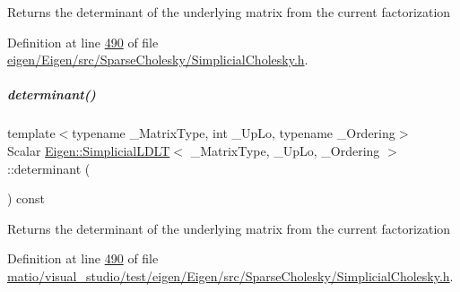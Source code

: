 \begin{DoxyReturn}{Returns}
the determinant of the underlying matrix from the current factorization 
\end{DoxyReturn}


Definition at line \hyperlink{eigen_2_eigen_2src_2_sparse_cholesky_2_simplicial_cholesky_8h_source_l00490}{490} of file \hyperlink{eigen_2_eigen_2src_2_sparse_cholesky_2_simplicial_cholesky_8h_source}{eigen/\+Eigen/src/\+Sparse\+Cholesky/\+Simplicial\+Cholesky.\+h}.

\mbox{\label{group___sparse_cholesky___module_aa25042f3b49880f5e487d468ea20b1b7}} 
\subparagraph{\texorpdfstring{determinant()}{determinant()}\hspace{0.1cm}{\footnotesize\ttfamily [2/2]}}
{\footnotesize\ttfamily template$<$typename \+\_\+\+Matrix\+Type, int \+\_\+\+Up\+Lo, typename \+\_\+\+Ordering$>$ \\
Scalar \hyperlink{group___sparse_cholesky___module_class_eigen_1_1_simplicial_l_d_l_t}{Eigen\+::\+Simplicial\+L\+D\+LT}$<$ \+\_\+\+Matrix\+Type, \+\_\+\+Up\+Lo, \+\_\+\+Ordering $>$\+::determinant (\begin{DoxyParamCaption}{ }\end{DoxyParamCaption}) const\hspace{0.3cm}{\ttfamily [inline]}}

\begin{DoxyReturn}{Returns}
the determinant of the underlying matrix from the current factorization 
\end{DoxyReturn}


Definition at line \hyperlink{matio_2visual__studio_2test_2eigen_2_eigen_2src_2_sparse_cholesky_2_simplicial_cholesky_8h_source_l00490}{490} of file \hyperlink{matio_2visual__studio_2test_2eigen_2_eigen_2src_2_sparse_cholesky_2_simplicial_cholesky_8h_source}{matio/visual\+\_\+studio/test/eigen/\+Eigen/src/\+Sparse\+Cholesky/\+Simplicial\+Cholesky.\+h}.

